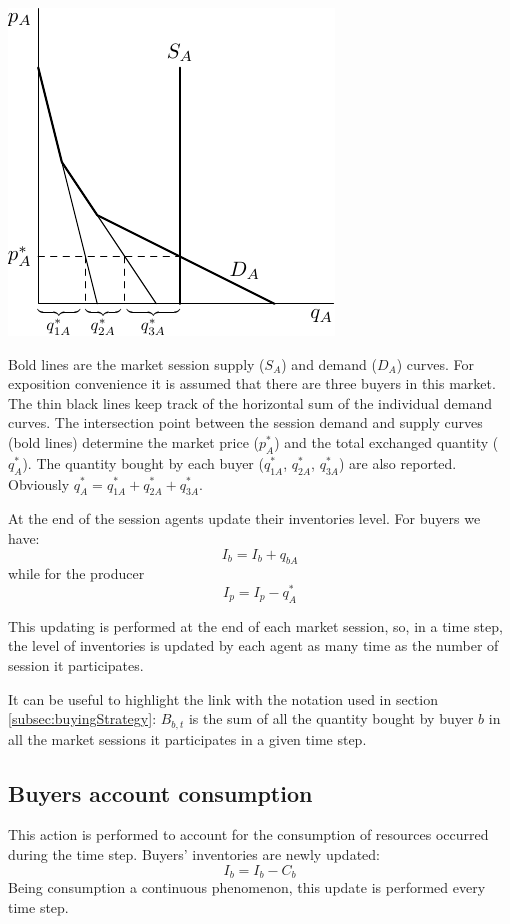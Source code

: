 \documentclass{article}
\begin{document}
\vskip5mm
\centerline{\includegraphics{fig_market_equilibrium-0.pdf}}

\vskip5mm
Bold lines are the market session supply ($S_A$) and demand ($D_A$) curves. For exposition convenience it is assumed that there are three buyers in this market. The thin black lines keep track of the horizontal sum of the individual demand curves. The intersection point between the session demand and supply curves (bold lines) determine the market price ($p^*_A$) and the total exchanged quantity ($q^*_A$). The quantity bought by each buyer ($q^*_{1A}$, $q^*_{2A}$, $q^*_{3A}$) are also reported. Obviously $q^*_A=q^*_{1A}+q^*_{2A}+q^*_{3A}$.

At the end of the session agents update their inventories level.
For buyers we have:
\[ I_b=I_b+q_{bA}\]
while for the producer
\[ I_p=I_p-q^*_A\]

This updating is performed at the end of each market session, so, in a time step, the level of inventories is updated by each agent as many time as the number of session it participates.

It can be useful to highlight the link with the notation used in section \ref{subsec:buyingStrategy}: $B_{b,t}$ is the sum of all the quantity bought by buyer $b$ in all the market sessions it participates in a given time step.   


\subsection{Buyers account consumption}

This action is performed to account for the consumption of resources occurred during the time step. Buyers' inventories are newly updated:
\[
I_b=I_b-C_b
\]
Being consumption a continuous phenomenon, this update is performed every time step.
\end{document}
